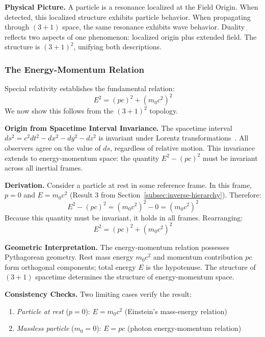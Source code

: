 \documentclass[aps,prd,preprint,superscriptaddress,showpacs,preprintnumbers,amsmath,amssymb,nofootinbib]{revtex4-2}
\begin{document}
\textbf{Physical Picture.}
A particle is a resonance localized at the Field Origin. When detected, this localized structure exhibits particle behavior. When propagating through $(3+1)$ space, the same resonance exhibits wave behavior. Duality reflects two aspects of one phenomenon: localized origin plus extended field. The structure is $(3+1)^2$, unifying both descriptions.

\subsubsection*{The Energy-Momentum Relation}

Special relativity establishes the fundamental relation:
\begin{equation}
E^2 = (pc)^2 + (m_0 c^2)^2
\label{eq:energy_momentum}
\end{equation}
We now show this follows from the $(3+1)^2$ topology.

\textbf{Origin from Spacetime Interval Invariance.}
The spacetime interval $ds^2 = c^2 dt^2 - dx^2 - dy^2 - dz^2$ is invariant under Lorentz transformations~\cite{weinberg1972}. All observers agree on the value of $ds$, regardless of relative motion. This invariance extends to energy-momentum space: the quantity $E^2 - (pc)^2$ must be invariant across all inertial frames.

\textbf{Derivation.}
Consider a particle at rest in some reference frame. In this frame, $p = 0$ and $E = m_0 c^2$ (Result 3 from Section~\ref{subsec:inverse-hierarchy}). Therefore:
\begin{equation}
E^2 - (pc)^2 = (m_0 c^2)^2 - 0 = (m_0 c^2)^2
\end{equation}
Because this quantity must be invariant, it holds in all frames. Rearranging:
\begin{equation}
E^2 = (pc)^2 + (m_0 c^2)^2
\end{equation}

\textbf{Geometric Interpretation.}
The energy-momentum relation possesses Pythagorean geometry. Rest mass energy $m_0 c^2$ and momentum contribution $pc$ form orthogonal components; total energy $E$ is the hypotenuse. The structure of $(3+1)$ spacetime determines the structure of energy-momentum space.

\textbf{Consistency Checks.}
Two limiting cases verify the result:
\begin{enumerate}
    \item \emph{Particle at rest} ($p = 0$): $E = m_0 c^2$ (Einstein's mass-energy relation)
    \item \emph{Massless particle} ($m_0 = 0$): $E = pc$ (photon energy-momentum relation)
\end{enumerate}
\end{document}
